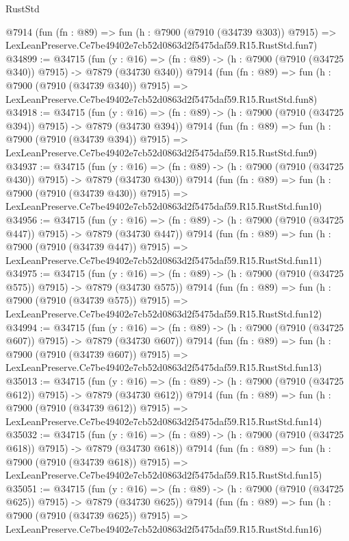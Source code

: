 \begin{lexlean}{RustStd}
\begin{coremodule}
    @7914
    (fun (fn : @89) =>
    fun (h : @7900 (@7910 (@34739 @303)) @7915) =>
    LexLeanPreserve.Ce7be49402e7cb52d0863d2f5475daf59.R15.RustStd.fun7)
@34899 := @34715
    (fun (y : @16) => (fn : @89) -> (h : @7900 (@7910 (@34725 @340)) @7915) -> @7879 (@34730 @340))
    @7914
    (fun (fn : @89) =>
    fun (h : @7900 (@7910 (@34739 @340)) @7915) =>
    LexLeanPreserve.Ce7be49402e7cb52d0863d2f5475daf59.R15.RustStd.fun8)
@34918 := @34715
    (fun (y : @16) => (fn : @89) -> (h : @7900 (@7910 (@34725 @394)) @7915) -> @7879 (@34730 @394))
    @7914
    (fun (fn : @89) =>
    fun (h : @7900 (@7910 (@34739 @394)) @7915) =>
    LexLeanPreserve.Ce7be49402e7cb52d0863d2f5475daf59.R15.RustStd.fun9)
@34937 := @34715
    (fun (y : @16) => (fn : @89) -> (h : @7900 (@7910 (@34725 @430)) @7915) -> @7879 (@34730 @430))
    @7914
    (fun (fn : @89) =>
    fun (h : @7900 (@7910 (@34739 @430)) @7915) =>
    LexLeanPreserve.Ce7be49402e7cb52d0863d2f5475daf59.R15.RustStd.fun10)
@34956 := @34715
    (fun (y : @16) => (fn : @89) -> (h : @7900 (@7910 (@34725 @447)) @7915) -> @7879 (@34730 @447))
    @7914
    (fun (fn : @89) =>
    fun (h : @7900 (@7910 (@34739 @447)) @7915) =>
    LexLeanPreserve.Ce7be49402e7cb52d0863d2f5475daf59.R15.RustStd.fun11)
@34975 := @34715
    (fun (y : @16) => (fn : @89) -> (h : @7900 (@7910 (@34725 @575)) @7915) -> @7879 (@34730 @575))
    @7914
    (fun (fn : @89) =>
    fun (h : @7900 (@7910 (@34739 @575)) @7915) =>
    LexLeanPreserve.Ce7be49402e7cb52d0863d2f5475daf59.R15.RustStd.fun12)
@34994 := @34715
    (fun (y : @16) => (fn : @89) -> (h : @7900 (@7910 (@34725 @607)) @7915) -> @7879 (@34730 @607))
    @7914
    (fun (fn : @89) =>
    fun (h : @7900 (@7910 (@34739 @607)) @7915) =>
    LexLeanPreserve.Ce7be49402e7cb52d0863d2f5475daf59.R15.RustStd.fun13)
@35013 := @34715
    (fun (y : @16) => (fn : @89) -> (h : @7900 (@7910 (@34725 @612)) @7915) -> @7879 (@34730 @612))
    @7914
    (fun (fn : @89) =>
    fun (h : @7900 (@7910 (@34739 @612)) @7915) =>
    LexLeanPreserve.Ce7be49402e7cb52d0863d2f5475daf59.R15.RustStd.fun14)
@35032 := @34715
    (fun (y : @16) => (fn : @89) -> (h : @7900 (@7910 (@34725 @618)) @7915) -> @7879 (@34730 @618))
    @7914
    (fun (fn : @89) =>
    fun (h : @7900 (@7910 (@34739 @618)) @7915) =>
    LexLeanPreserve.Ce7be49402e7cb52d0863d2f5475daf59.R15.RustStd.fun15)
@35051 := @34715
    (fun (y : @16) => (fn : @89) -> (h : @7900 (@7910 (@34725 @625)) @7915) -> @7879 (@34730 @625))
    @7914
    (fun (fn : @89) =>
    fun (h : @7900 (@7910 (@34739 @625)) @7915) =>
    LexLeanPreserve.Ce7be49402e7cb52d0863d2f5475daf59.R15.RustStd.fun16)

\end{coremodule}
\end{lexlean}
